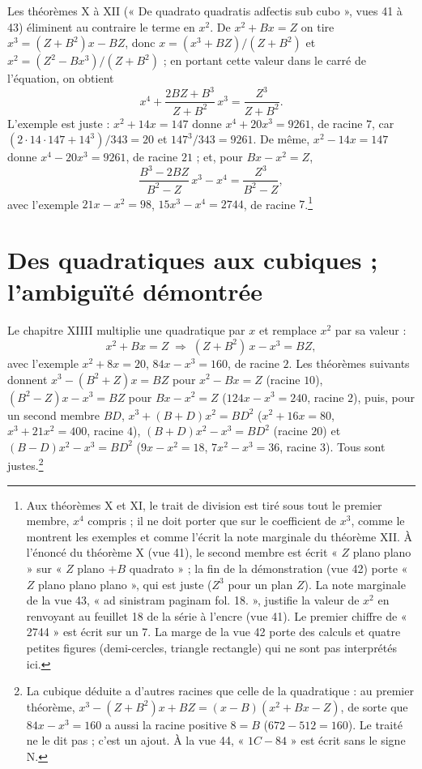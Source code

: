 \documentclass[11pt,a4paper]{article}
\begin{document}
Les théorèmes X à XII (« De quadrato quadratis adfectis sub cubo », vues 41 à
43) éliminent au contraire le terme en $x^2$. De $x^2 + Bx = Z$ on tire
$x^3 = (Z + B^2)x - BZ$, donc $x = (x^3 + BZ)/(Z + B^2)$ et
$x^2 = (Z^2 - Bx^3)/(Z + B^2)$ ; en portant cette valeur dans le carré de
l'équation, on obtient
\[ x^4 + \frac{2BZ + B^3}{Z + B^2}\,x^3 = \frac{Z^3}{Z + B^2} . \]
L'exemple est juste : $x^2 + 14x = 147$ donne $x^4 + 20x^3 = 9261$, de racine
$7$, car $(2 \cdot 14 \cdot 147 + 14^3)/343 = 20$ et $147^3/343 = 9261$. De même,
$x^2 - 14x = 147$ donne $x^4 - 20x^3 = 9261$, de racine $21$ ; et, pour
$Bx - x^2 = Z$,
\[ \frac{B^3 - 2BZ}{B^2 - Z}\,x^3 - x^4 = \frac{Z^3}{B^2 - Z} , \]
avec l'exemple $21x - x^2 = 98$, $15x^3 - x^4 = 2744$, de racine $7$.\footnote{Aux
théorèmes X et XI, le trait de division est tiré sous tout le premier membre,
$x^4$ compris ; il ne doit porter que sur le coefficient de $x^3$, comme le
montrent les exemples et comme l'écrit la note marginale du théorème XII. À
l'énoncé du théorème X (vue 41), le second membre est écrit « $Z$ plano
plano » sur « $Z$ plano $+ B$ quadrato » ; la fin de la démonstration (vue 42)
porte « $Z$ plano plano plano », qui est juste ($Z^3$ pour un plan $Z$). La note
marginale de la vue 43, « ad sinistram paginam fol. 18. », justifie la valeur
de $x^2$ en renvoyant au feuillet 18 de la série à l'encre (vue 41). Le premier
chiffre de « 2744 » est écrit sur un 7. La marge de la vue 42 porte des calculs
et quatre petites figures (demi-cercles, triangle rectangle) qui ne sont pas
interprétés ici.}

\section*{Des quadratiques aux cubiques ; l'ambiguïté démontrée}

Le chapitre XIIII multiplie une quadratique par $x$ et remplace $x^2$ par sa
valeur :
\[ x^2 + Bx = Z \;\Longrightarrow\; (Z + B^2)\,x - x^3 = BZ , \]
avec l'exemple $x^2 + 8x = 20$, $84x - x^3 = 160$, de racine $2$. Les théorèmes
suivants donnent $x^3 - (B^2 + Z)x = BZ$ pour $x^2 - Bx = Z$ (racine $10$),
$(B^2 - Z)x - x^3 = BZ$ pour $Bx - x^2 = Z$ ($124x - x^3 = 240$, racine $2$),
puis, pour un second membre $BD$, $x^3 + (B + D)x^2 = BD^2$ ($x^2 + 16x = 80$,
$x^3 + 21x^2 = 400$, racine $4$), $(B + D)x^2 - x^3 = BD^2$ (racine $20$) et
$(B - D)x^2 - x^3 = BD^2$ ($9x - x^2 = 18$, $7x^2 - x^3 = 36$, racine $3$). Tous
sont justes.\footnote{La cubique déduite a d'autres racines que celle de la
quadratique : au premier théorème,
$x^3 - (Z + B^2)x + BZ = (x - B)(x^2 + Bx - Z)$, de sorte que $84x - x^3 = 160$ a
aussi la racine positive $8 = B$ ($672 - 512 = 160$). Le traité ne le dit pas ;
c'est un ajout. À la vue 44, « $1C - 84$ » est écrit sans le signe N.}
\end{document}

